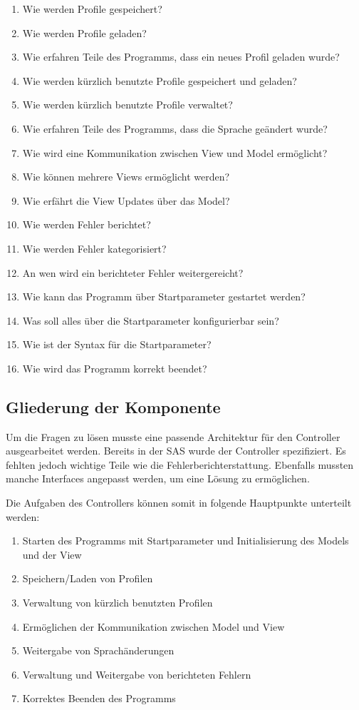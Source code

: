 \begin{enumerate}
  \item Wie werden Profile gespeichert?
  \item Wie werden Profile geladen?
  \item Wie erfahren Teile des Programms, dass ein neues Profil geladen wurde?
  \item Wie werden kürzlich benutzte Profile gespeichert und geladen?
  \item Wie werden kürzlich benutzte Profile verwaltet?
  \item Wie erfahren Teile des Programms, dass die Sprache geändert wurde?
  \item Wie wird eine Kommunikation zwischen View und Model ermöglicht?
  \item Wie können mehrere Views ermöglicht werden?
  \item Wie erfährt die View Updates über das Model?
  \item Wie werden Fehler berichtet?
  \item Wie werden Fehler kategorisiert?
  \item An wen wird ein berichteter Fehler weitergereicht?
  \item Wie kann das Programm über Startparameter gestartet werden?
  \item Was soll alles über die Startparameter konfigurierbar sein?
  \item Wie ist der Syntax für die Startparameter?
  \item Wie wird das Programm korrekt beendet?
\end{enumerate}

\subsection{Gliederung der Komponente}
Um die Fragen zu lösen musste eine passende Architektur für den Controller ausgearbeitet werden. Bereits in der
SAS wurde der Controller spezifiziert. Es fehlten jedoch wichtige Teile wie die Fehlerberichterstattung.
Ebenfalls mussten manche Interfaces angepasst werden, um eine Lösung zu ermöglichen.

Die Aufgaben des Controllers können somit in folgende Hauptpunkte unterteilt werden:

\begin{enumerate}
  \item Starten des Programms mit Startparameter und Initialisierung des Models und der View
  \item Speichern/Laden von Profilen
  \item Verwaltung von kürzlich benutzten Profilen
  \item Ermöglichen der Kommunikation zwischen Model und View
  \item Weitergabe von Sprachänderungen
  \item Verwaltung und Weitergabe von berichteten Fehlern
  \item Korrektes Beenden des Programms
\end{enumerate}

